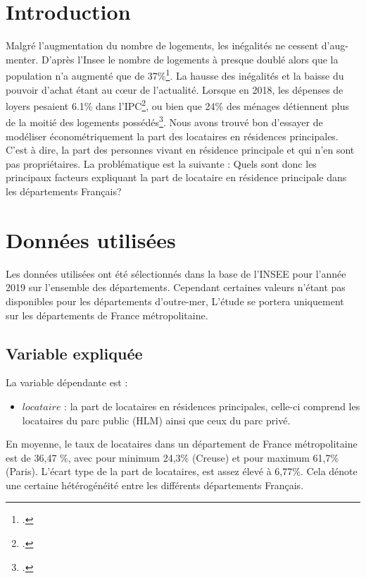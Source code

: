 \documentclass[12pt]{article}
\begin{document}
\section{Introduction}
Malgré l'augmentation du nombre de logements, les inégalités ne cessent d'aug-menter. D'après l'Insee le nombre de logements à presque doublé alors que la population n'a augmenté que 
de 37\%\footcite{evolution_hab}. La hausse des inégalités et la baisse du pouvoir d'achat étant au cœur de l'actualité. Lorsque en 2018, les dépenses de loyers pesaient 6.1\% dans l'IPC\footcite{ipc_loyer}, ou bien que 24\% des ménages détiennent plus de la moitié des logements possédés\footcite{part_appart}. Nous avons trouvé bon d'essayer de modéliser économétriquement la part des locataires en résidences principales. C'est à dire, la part des personnes vivant en résidence principale et qui n'en sont pas propriétaires. La problématique est la suivante :
Quels sont donc les principaux facteurs expliquant la part de locataire en résidence principale dans les départements Français? 

\section{Données utilisées}
Les données utilisées ont été sélectionnés dans la base de l'INSEE pour l'année 2019 sur l'ensemble des départements. Cependant certaines valeurs n'étant pas disponibles pour les départements d'outre-mer,
L'étude se portera uniquement sur les départements de France métropolitaine.
\subsection{Variable expliquée}
La variable dépendante est :
\begin{itemize}
    \item $locataire$ : la part de locataires en résidences principales, celle-ci comprend les locataires du parc public (HLM) ainsi que ceux du parc privé.
\end{itemize}
En moyenne, le taux de locataires dans un département de France métropolitaine est de 36,47 \%, avec pour minimum 24,3\% (Creuse) et pour maximum 61,7\%(Paris).
L'écart type de la part de locataires, est assez élevé à 6,77\%. Cela dénote une certaine hétérogénéité entre les différents départements Français.
\end{document}
